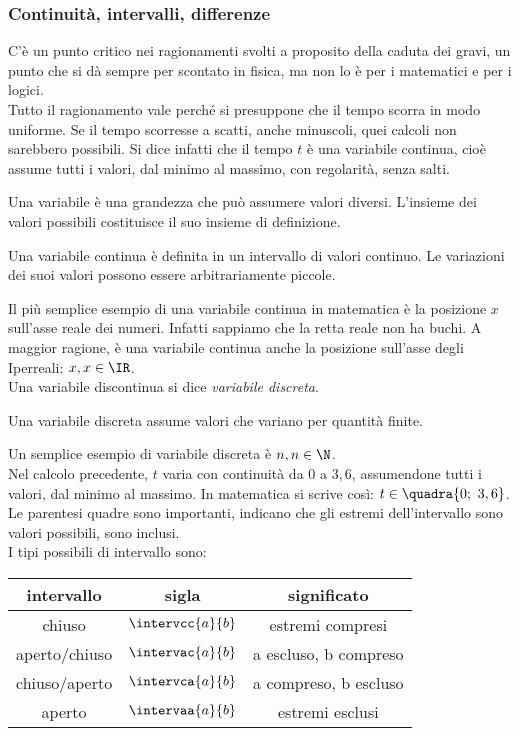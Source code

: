 \subsubsection{Continuità, intervalli, differenze}
\label{04_diffcontinterv}
C'è un punto critico nei ragionamenti svolti a proposito della caduta dei gravi,
un punto che si dà sempre per scontato in fisica, ma non lo è per i matematici
e per i logici.\\
Tutto il ragionamento vale perché si presuppone che il tempo scorra in modo
uniforme. Se il tempo scorresse a scatti, anche minuscoli, quei calcoli non
sarebbero possibili. Si dice infatti che il tempo $t$ è una variabile
continua, cioè assume tutti i valori, dal minimo al massimo, con regolarità,
senza salti.

\begin{definizione}
 Una variabile è una grandezza che può assumere valori diversi.
 L'insieme dei valori possibili costituisce il suo insieme di definizione.
\end{definizione}

\begin{definizione}
 Una variabile continua è definita in un intervallo di valori continuo.
 Le variazioni dei suoi valori possono essere arbitrariamente piccole.
\end{definizione}

Il più semplice esempio di una variabile continua in matematica è la 
posizione $x$ sull'asse reale dei numeri. Infatti sappiamo che la retta reale non
ha buchi. A maggior ragione, è una variabile continua anche la posizione sull'asse 
degli Iperreali: $x,x\in\IR$. \\
Una variabile discontinua si dice \emph{variabile discreta}. 
\begin{definizione}
 Una variabile discreta assume valori che variano per quantità
 finite.
\end{definizione}

Un semplice esempio di variabile discreta è $n, n\in \N$.\\
Nel calcolo precedente, $t$ varia con continuità da $0$ a $3,6$,
assumendone tutti i valori, dal minimo al massimo. In matematica si scrive così:
\(t\in \quadra{0;\ 3,6}\). Le parentesi quadre sono importanti, indicano che gli estremi
dell'intervallo sono valori possibili, sono inclusi.\\
I tipi possibili di intervallo sono:

\begin{center}
\begin{tabular}{ccc}\toprule
intervallo & sigla & significato\\\midrule
chiuso &$\intervcc{a}{b}$  & estremi compresi\\
aperto/chiuso & $\intervac{a}{b}$ & a escluso, b compreso\\
chiuso/aperto & $\intervca{a}{b}$ & a compreso, b escluso\\
aperto & $\intervaa{a}{b}$ & estremi esclusi\\\bottomrule
\end{tabular}
\label{tab:diff_tipiinterv}
\end{center}

